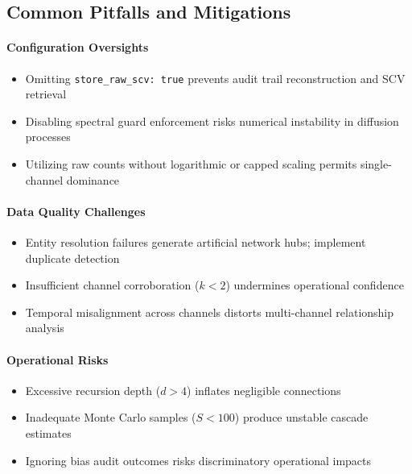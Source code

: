 \documentclass[12pt]{article}
\theoremstyle{plain}
\begin{document}
\subsection{Common Pitfalls and Mitigations}
\label{subsec:common-pitfalls}
\paragraph{Configuration Oversights}
\begin{itemize}\itemsep0.2em
  \item Omitting \texttt{store\_raw\_scv: true} prevents audit trail reconstruction and SCV retrieval
  \item Disabling spectral guard enforcement risks numerical instability in diffusion processes
  \item Utilizing raw counts without logarithmic or capped scaling permits single-channel dominance
\end{itemize}

\paragraph{Data Quality Challenges}
\begin{itemize}\itemsep0.2em
  \item Entity resolution failures generate artificial network hubs; implement duplicate detection
  \item Insufficient channel corroboration ($k<2$) undermines operational confidence
  \item Temporal misalignment across channels distorts multi-channel relationship analysis
\end{itemize}

\paragraph{Operational Risks}
\begin{itemize}\itemsep0.2em
  \item Excessive recursion depth ($d>4$) inflates negligible connections
  \item Inadequate Monte Carlo samples ($S<100$) produce unstable cascade estimates
  \item Ignoring bias audit outcomes risks discriminatory operational impacts
\end{itemize}
\end{document}

